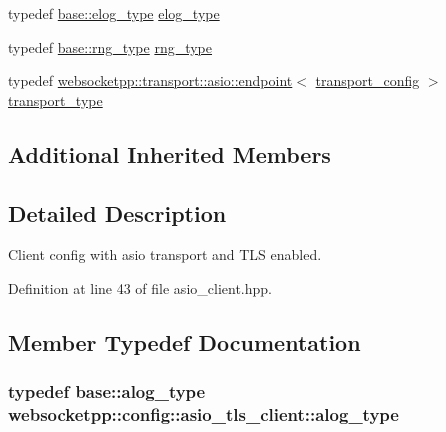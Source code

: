 \begin{DoxyCompactItemize}
\item 
typedef \hyperlink{structwebsocketpp_1_1config_1_1core__client_a24f1bae9e8a92bf7950153ed39eaffb8}{base\+::elog\+\_\+type} \hyperlink{structwebsocketpp_1_1config_1_1asio__tls__client_a3d1c84bbdde66356494584dd9ea5818c}{elog\+\_\+type}
\item 
typedef \hyperlink{structwebsocketpp_1_1config_1_1core__client_adacb3a0ec249a2dea11871f299cf660f}{base\+::rng\+\_\+type} \hyperlink{structwebsocketpp_1_1config_1_1asio__tls__client_ac546cdbb58db76187d9fac5426eba65e}{rng\+\_\+type}
\item 
typedef \hyperlink{classwebsocketpp_1_1transport_1_1asio_1_1endpoint}{websocketpp\+::transport\+::asio\+::endpoint}$<$ \hyperlink{structwebsocketpp_1_1config_1_1asio__tls__client_1_1transport__config}{transport\+\_\+config} $>$ \hyperlink{structwebsocketpp_1_1config_1_1asio__tls__client_a24a07a9b1d8bb48d67317a46acb6eef6}{transport\+\_\+type}
\end{DoxyCompactItemize}
\subsection*{Additional Inherited Members}


\subsection{Detailed Description}
Client config with asio transport and T\+L\+S enabled. 

Definition at line 43 of file asio\+\_\+client.\+hpp.



\subsection{Member Typedef Documentation}
\hypertarget{structwebsocketpp_1_1config_1_1asio__tls__client_ace0e6858f14ca5a442e3217c1afc8f6f}{}
\subsubsection[{alog\+\_\+type}]{\setlength{\rightskip}{0pt plus 5cm}typedef {\bf base\+::alog\+\_\+type} {\bf websocketpp\+::config\+::asio\+\_\+tls\+\_\+client\+::alog\+\_\+type}}\label{structwebsocketpp_1_1config_1_1asio__tls__client_ace0e6858f14ca5a442e3217c1afc8f6f}


